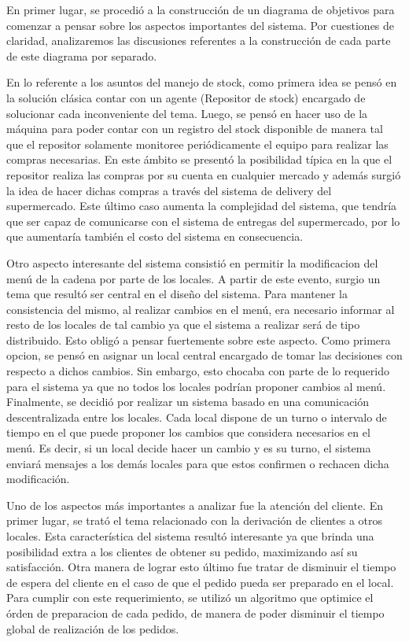 \documentclass[a4paper,11pt] {article}
\begin{document}
En primer lugar, se procedi\'o a la construcci\'on de un diagrama de objetivos para comenzar a pensar sobre los aspectos importantes del sistema. Por cuestiones de claridad, analizaremos las discusiones referentes a la construcci\'on de cada parte de este diagrama por separado.

En lo referente a los asuntos del manejo de stock, como primera idea se pens\'o en la soluci\'on cl\'asica contar con un agente (Repositor de stock) encargado de solucionar cada inconveniente del tema. Luego, se pens\'o en hacer uso de la m\'aquina para poder contar con un registro del stock disponible de manera tal que el repositor solamente monitoree peri\'odicamente el equipo para realizar las compras necesarias. En este \'ambito se present\'o la posibilidad t\'ipica en la que el repositor realiza las compras por su cuenta en cualquier mercado y adem\'as surgi\'o la idea de hacer dichas compras a trav\'es del sistema de delivery del supermercado. Este \'ultimo caso aumenta la complejidad del sistema, que tendr\'ia que ser capaz de comunicarse con el sistema de entregas del supermercado, por lo que aumentar\'ia tambi\'en el costo del sistema en consecuencia.

Otro aspecto interesante del sistema consisti\'o en permitir la modificacion del men\'u de la cadena por parte de los locales. A partir de este evento, surgio un tema que result\'o ser central en el dise\~no del sistema. Para mantener la consistencia del mismo, al realizar cambios en el men\'u, era necesario informar al resto de los locales de tal cambio ya que el sistema a realizar ser\'a de tipo distribuido. Esto oblig\'o a pensar fuertemente sobre este aspecto. Como primera opcion, se pens\'o en asignar un local central encargado de tomar las decisiones con respecto a dichos cambios. Sin embargo, esto chocaba con parte de lo requerido para el sistema ya que no todos los locales podr\'ian proponer cambios al men\'u. Finalmente, se decidi\'o por realizar un sistema basado en una comunicaci\'on descentralizada entre los locales. Cada local dispone de un turno o intervalo de tiempo en el que puede proponer los cambios que considera necesarios en el men\'u. Es decir, si un local decide hacer un cambio y es su turno, el sistema enviar\'a mensajes a los dem\'as locales para que estos confirmen o rechacen dicha modificaci\'on.
 
Uno de los aspectos m\'as importantes a analizar fue la atenci\'on del cliente. En primer lugar, se trat\'o el tema relacionado con la derivaci\'on de clientes a otros locales. Esta caracter\'istica del sistema result\'o interesante ya que brinda una posibilidad extra a los clientes de obtener su pedido, maximizando as\'i su satisfacci\'on. Otra manera de lograr esto \'ultimo fue tratar de disminuir el tiempo de espera del cliente en el caso de que el pedido pueda ser preparado en el local. Para cumplir con este requerimiento, se utiliz\'o un algoritmo que optimice el \'orden de preparacion de cada pedido, de manera de poder disminuir el tiempo global de realizaci\'on de los pedidos.
\end{document}

